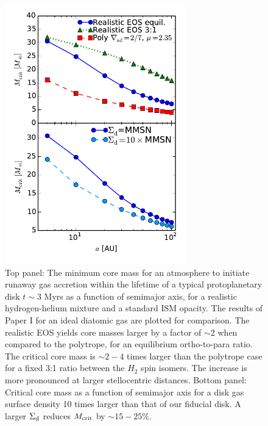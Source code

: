 \begin{figure}[H]
\centering
\includegraphics[width=0.7\textwidth]{figures/Mc_vs_a_poly_real_paper.pdf}
\caption{Top panel: The minimum core mass for an atmosphere to initiate runaway gas accretion within the lifetime of a typical protoplanetary disk $t \sim 3$ Myrs as a function of semimajor axis, for a realistic hydrogen-helium mixture and a standard ISM opacity. The results of Paper I for an ideal diatomic gas are plotted for comparison. The realistic EOS yields core masses larger by a factor of $\sim$2 when compared to the polytrope, for an equilibrium ortho-to-para ratio. The critical core mass is $\sim$$2-4$ times larger than the polytrope case for a fixed 3:1 ratio between the $H_2$ spin isomers. The increase is more pronounced at larger stellocentric distances. Bottom panel: Critical core mass as a function of semimajor axis for a disk gas surface density 10 times larger than that of our fiducial disk. A larger $\Sigma_{\rm d}$ reduces $M_{\rm crit}$ by $\sim$$15-25 \%$.}
\label{fig:Mvsaplot}
\end{figure}



